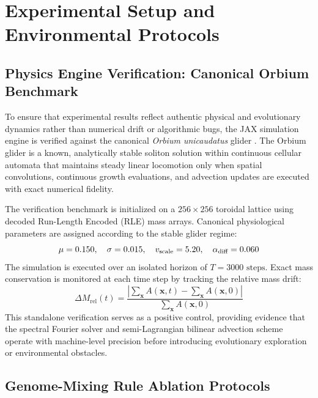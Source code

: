 \section{Experimental Setup and Environmental Protocols}
\label{sec:experimental_setup}

\subsection{Physics Engine Verification: Canonical Orbium Benchmark}
\label{subsec:exp_physics_verification}

To ensure that experimental results reflect authentic physical and evolutionary dynamics rather than numerical drift or algorithmic bugs, the JAX simulation engine is verified against the canonical \textit{Orbium unicaudatus} glider \parencite{chan2019lenia, plantec2025flowlenia}. The Orbium glider is a known, analytically stable soliton solution within continuous cellular automata that maintains steady linear locomotion only when spatial convolutions, continuous growth evaluations, and advection updates are executed with exact numerical fidelity.

The verification benchmark is initialized on a $256 \times 256$ toroidal lattice using decoded Run-Length Encoded (RLE) mass arrays. Canonical physiological parameters are assigned according to the stable glider regime:
\begin{equation}
\mu = 0.150, \quad \sigma = 0.015, \quad v_{\text{scale}} = 5.20, \quad \alpha_{\text{diff}} = 0.060
\label{eq:orbium_parameters}
\end{equation}
The simulation is executed over an isolated horizon of $T = 3000\text{ steps}$. Exact mass conservation is monitored at each time step by tracking the relative mass drift:
\begin{equation}
\Delta M_{\text{rel}}(t) = \frac{\left| \sum_{\mathbf{x}} A(\mathbf{x}, t) - \sum_{\mathbf{x}} A(\mathbf{x}, 0) \right|}{\sum_{\mathbf{x}} A(\mathbf{x}, 0)}
\label{eq:mass_drift_metric}
\end{equation}
This standalone verification serves as a positive control, providing evidence that the spectral Fourier solver and semi-Lagrangian bilinear advection scheme \parencite{moroz2020reintegration} operate with machine-level precision before introducing evolutionary exploration or environmental obstacles.

\subsection{Genome-Mixing Rule Ablation Protocols}
\label{subsec:exp_mixing_ablations}

